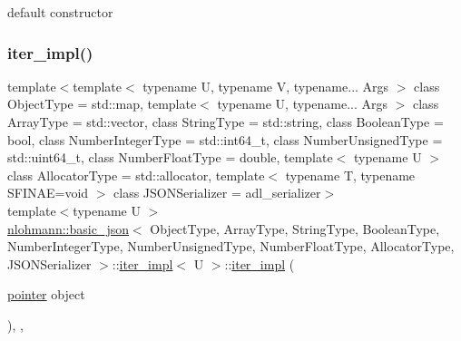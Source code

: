 default constructor 

\mbox{\label{classnlohmann_1_1basic__json_1_1iter__impl_aa496f5348569e75d65592f25e1664770}} 
\subsubsection{\texorpdfstring{iter\_impl()}{iter\_impl()}\hspace{0.1cm}{\footnotesize\ttfamily [2/3]}}
{\footnotesize\ttfamily template$<$template$<$ typename U, typename V, typename... Args $>$ class Object\+Type = std\+::map, template$<$ typename U, typename... Args $>$ class Array\+Type = std\+::vector, class String\+Type  = std\+::string, class Boolean\+Type  = bool, class Number\+Integer\+Type  = std\+::int64\+\_\+t, class Number\+Unsigned\+Type  = std\+::uint64\+\_\+t, class Number\+Float\+Type  = double, template$<$ typename U $>$ class Allocator\+Type = std\+::allocator, template$<$ typename T, typename S\+F\+I\+N\+A\+E=void $>$ class J\+S\+O\+N\+Serializer = adl\+\_\+serializer$>$ \\
template$<$typename U $>$ \\
\mbox{\hyperlink{classnlohmann_1_1basic__json}{nlohmann\+::basic\+\_\+json}}$<$ Object\+Type, Array\+Type, String\+Type, Boolean\+Type, Number\+Integer\+Type, Number\+Unsigned\+Type, Number\+Float\+Type, Allocator\+Type, J\+S\+O\+N\+Serializer $>$\+::\mbox{\hyperlink{classnlohmann_1_1basic__json_1_1iter__impl}{iter\+\_\+impl}}$<$ U $>$\+::\mbox{\hyperlink{classnlohmann_1_1basic__json_1_1iter__impl}{iter\+\_\+impl}} (\begin{DoxyParamCaption}\item[{\mbox{\hyperlink{classnlohmann_1_1basic__json_1_1iter__impl_a3dddd7fa38b36e2531700ceb4a1ce9a8}{pointer}}}]{object }\end{DoxyParamCaption})\hspace{0.3cm}{\ttfamily [inline]}, {\ttfamily [explicit]}, {\ttfamily [noexcept]}}



